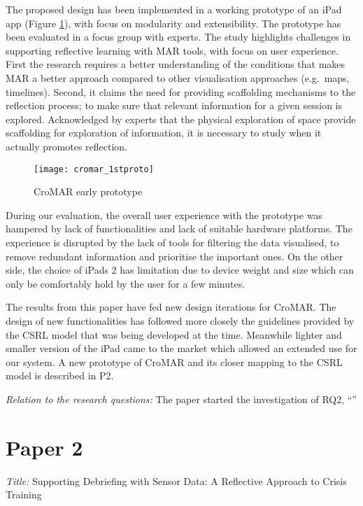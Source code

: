 The proposed design has been implemented in a working prototype of an iPad app (Figure \ref{fig:cromar-prototype}), with focus on modularity and extensibility. The prototype has been evaluated in a focus group with experts. The study highlights challenges in supporting reflective learning with MAR tools, with focus on user experience. First the research requires a better understanding of the conditions that makes MAR a better approach compared to other visualisation approaches (e.g.~maps, timelines). Second, it claims the need for providing scaffolding mechanisms to the reflection process; to make sure that relevant information for a given session is explored. Acknowledged by experts that the physical exploration of space provide scaffolding for exploration of information, it is necessary to study when it actually promotes reflection. 

\begin{figure}
	[tbh] \centering 
	\texttt{[image: cromar\_1stproto]} \caption{CroMAR early prototype} \label{fig:cromar-prototype} 
\end{figure}

During our evaluation, the overall user experience with the prototype was hampered by lack of functionalities and lack of suitable hardware platforms. The experience is disrupted by the lack of tools for filtering the data visualised, to remove redundant information and prioritise the important ones. On the other side, the choice of iPads 2 has limitation due to device weight and size which can only be comfortably hold by the user for a few minutes.

The results from this paper have fed new design iterations for CroMAR. The design of new functionalities has followed more closely the guidelines provided by the CSRL model that was being developed at the time. Meanwhile lighter and smaller version of the iPad came to the market which allowed an extended use for our system. A new prototype of CroMAR and its closer mapping to the CSRL model is described in P2.

\emph{Relation to the research questions: } The paper started the investigation of RQ2, ``\RQii'' 

\section[Supporting Debriefing with Sensor Data: A Reflective Approach to Crisis Training]{Paper 2}\label{paper-2}

\emph{Title:} Supporting Debriefing with Sensor Data: A Reflective Approach to Crisis Training


